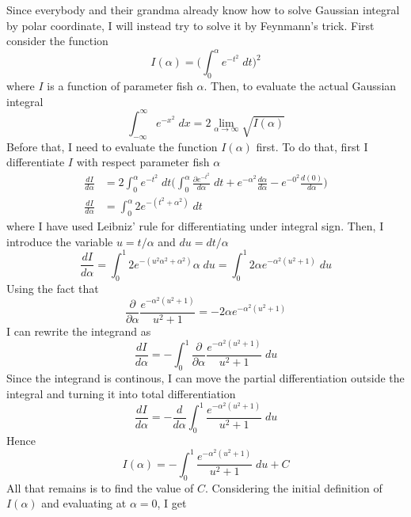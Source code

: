 \documentclass[../main.tex]{subfiles}
\begin{document}
Since everybody and their grandma already know how to solve Gaussian integral by polar coordinate, I will instead try to solve it by Feynmann's trick. First consider the function
\begin{equation*}
    I(\alpha)=\biggl(\int_{0}^{\alpha}e^{-t^2}\;dt\biggr)^2
\end{equation*}
where $I$ is a function of parameter fish $\alpha$. Then, to evaluate the actual Gaussian integral
\begin{equation*}
    \int_{-\infty}^{\infty}e^{-x^2}\;dx=2\lim_{\alpha\rightarrow\infty}\sqrt{I(\alpha)}
\end{equation*}
Before that, I need to evaluate the function $I(\alpha)$ first. To do that, first I differentiate $I$ with respect parameter fish $\alpha$
\begin{align*}
    \frac{dI}{d\alpha}&=2\int_{0}^{\alpha}e^{-t^2}\;dt\biggl(\int_{0}^{\alpha}\frac{\partial e^{-t^2}}{d\alpha}\;dt+e^{-\alpha^2}\frac{d\alpha}{d\alpha}-e^{-0^2}\frac{d(0)}{d\alpha}\biggr)\\
    \frac{dI}{d\alpha}&=\int_{0}^{\alpha}2e^{-(t^2+\alpha^2)}\;dt
\end{align*}
where I have used Leibniz' rule for differentiating under integral sign. Then, I introduce the variable $u=t/\alpha$ and $du=dt/\alpha$
\begin{equation*}
    \frac{dI}{d\alpha}=\int_{0}^{1}2e^{-(u^2\alpha^2+\alpha^2)}\alpha\;du=\int_{0}^{1}2\alpha e^{-\alpha^2(u^2+1)}\;du
\end{equation*}
Using the fact that
\begin{equation*}
    \frac{\partial}{\partial \alpha}\frac{e^{-\alpha^2(u^2+1)}}{u^2+1}=-2\alpha e^{-\alpha^2(u^2+1)}
\end{equation*}
I can rewrite the integrand as 
\begin{equation*}
    \frac{dI}{d\alpha}=-\int_{0}^{1}\frac{\partial}{\partial \alpha}\frac{e^{-\alpha^2(u^2+1)}}{u^2+1}\;du
\end{equation*}
Since the integrand is continous, I can move the partial differentiation outside the integral and turning it into total differentiation
\begin{equation*}
    \frac{dI}{d\alpha}=-\frac{d}{d\alpha}\int_{0}^{1}\frac{e^{-\alpha^2(u^2+1)}}{u^2+1}\;du
\end{equation*}
Hence
\begin{equation*}
    I(\alpha)=-\int_{0}^{1}\frac{e^{-\alpha^2(u^2+1)}}{u^2+1}\;du+C
\end{equation*}
All that remains is to find the value of $C$. Considering the initial definition of $I(\alpha)$ and evaluating at $\alpha=0$, I get 
\end{document}
